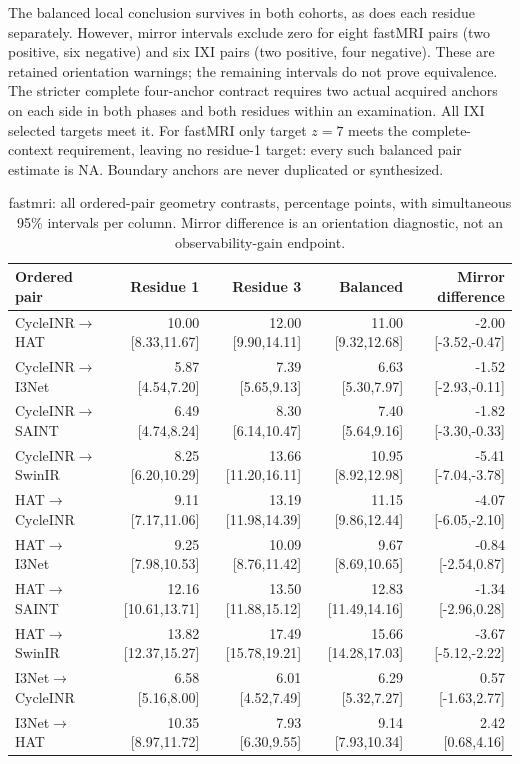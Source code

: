 The balanced local conclusion survives in both cohorts, as does each residue separately. However, mirror intervals exclude zero for eight fastMRI pairs (two positive, six negative) and six IXI pairs (two positive, four negative). These are retained orientation warnings; the remaining intervals do not prove equivalence. The stricter complete four-anchor contract requires two actual acquired anchors on each side in both phases and both residues within an examination. All IXI selected targets meet it. For fastMRI only target $z=7$ meets the complete-context requirement, leaving no residue-1 target: every such balanced pair estimate is NA. Boundary anchors are never duplicated or synthesized.
\begin{table}[t]\centering\scriptsize
\caption{fastmri: all ordered-pair geometry contrasts, percentage points, with simultaneous 95\% intervals per column. Mirror difference is an orientation diagnostic, not an observability-gain endpoint.}\label{tab:geometry-fastmri}\setlength{\tabcolsep}{4pt}
\begin{tabular}{lrrrr}\toprule
Ordered pair & Residue 1 & Residue 3 & Balanced & Mirror difference\\\midrule
CycleINR$\to$HAT & 10.00 [8.33,11.67] & 12.00 [9.90,14.11] & 11.00 [9.32,12.68] & -2.00 [-3.52,-0.47] \\
CycleINR$\to$I3Net & 5.87 [4.54,7.20] & 7.39 [5.65,9.13] & 6.63 [5.30,7.97] & -1.52 [-2.93,-0.11] \\
CycleINR$\to$SAINT & 6.49 [4.74,8.24] & 8.30 [6.14,10.47] & 7.40 [5.64,9.16] & -1.82 [-3.30,-0.33] \\
CycleINR$\to$SwinIR & 8.25 [6.20,10.29] & 13.66 [11.20,16.11] & 10.95 [8.92,12.98] & -5.41 [-7.04,-3.78] \\
HAT$\to$CycleINR & 9.11 [7.17,11.06] & 13.19 [11.98,14.39] & 11.15 [9.86,12.44] & -4.07 [-6.05,-2.10] \\
HAT$\to$I3Net & 9.25 [7.98,10.53] & 10.09 [8.76,11.42] & 9.67 [8.69,10.65] & -0.84 [-2.54,0.87] \\
HAT$\to$SAINT & 12.16 [10.61,13.71] & 13.50 [11.88,15.12] & 12.83 [11.49,14.16] & -1.34 [-2.96,0.28] \\
HAT$\to$SwinIR & 13.82 [12.37,15.27] & 17.49 [15.78,19.21] & 15.66 [14.28,17.03] & -3.67 [-5.12,-2.22] \\
I3Net$\to$CycleINR & 6.58 [5.16,8.00] & 6.01 [4.52,7.49] & 6.29 [5.32,7.27] & 0.57 [-1.63,2.77] \\
I3Net$\to$HAT & 10.35 [8.97,11.72] & 7.93 [6.30,9.55] & 9.14 [7.93,10.34] & 2.42 [0.68,4.16] \\

\end{tabular}
\end{table}
